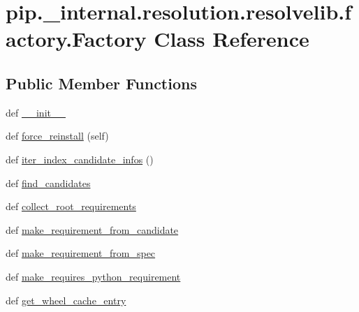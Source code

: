 \hypertarget{classpip_1_1__internal_1_1resolution_1_1resolvelib_1_1factory_1_1Factory}{}\section{pip.\+\_\+internal.\+resolution.\+resolvelib.\+factory.\+Factory Class Reference}
\label{classpip_1_1__internal_1_1resolution_1_1resolvelib_1_1factory_1_1Factory}
\subsection*{Public Member Functions}
\begin{DoxyCompactItemize}
\item 
def \hyperlink{classpip_1_1__internal_1_1resolution_1_1resolvelib_1_1factory_1_1Factory_ac89aed07a8ff139528f601e87647390a}{\+\_\+\+\_\+init\+\_\+\+\_\+}
\item 
def \hyperlink{classpip_1_1__internal_1_1resolution_1_1resolvelib_1_1factory_1_1Factory_a2e11f9ac49d160f25b407ae93e2eb0a5}{force\+\_\+reinstall} (self)
\item 
def \hyperlink{classpip_1_1__internal_1_1resolution_1_1resolvelib_1_1factory_1_1Factory_ae39b53329f2c9c0b39f1701042d2322e}{iter\+\_\+index\+\_\+candidate\+\_\+infos} ()
\item 
def \hyperlink{classpip_1_1__internal_1_1resolution_1_1resolvelib_1_1factory_1_1Factory_ac8597b0ba56e56d90345cf4ac7112d44}{find\+\_\+candidates}
\item 
def \hyperlink{classpip_1_1__internal_1_1resolution_1_1resolvelib_1_1factory_1_1Factory_aa91861702b56d85ead62f0258b3382d8}{collect\+\_\+root\+\_\+requirements}
\item 
def \hyperlink{classpip_1_1__internal_1_1resolution_1_1resolvelib_1_1factory_1_1Factory_a5e8c5b48117ec4cb1b41fe8afc26e225}{make\+\_\+requirement\+\_\+from\+\_\+candidate}
\item 
def \hyperlink{classpip_1_1__internal_1_1resolution_1_1resolvelib_1_1factory_1_1Factory_a91726744eb419319502b18308a8c5376}{make\+\_\+requirement\+\_\+from\+\_\+spec}
\item 
def \hyperlink{classpip_1_1__internal_1_1resolution_1_1resolvelib_1_1factory_1_1Factory_a5e391bd3e91125699eb3b11d42f3e9bc}{make\+\_\+requires\+\_\+python\+\_\+requirement}
\item 
def \hyperlink{classpip_1_1__internal_1_1resolution_1_1resolvelib_1_1factory_1_1Factory_a46de4b5bbd1cb0ada218085750091ee9}{get\+\_\+wheel\+\_\+cache\+\_\+entry}

\end{DoxyCompactItemize}
